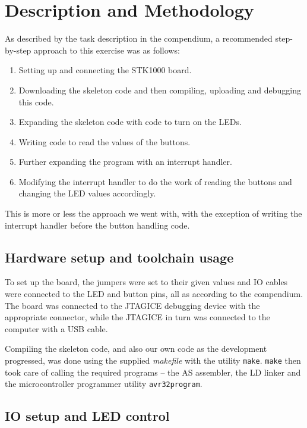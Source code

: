 \section{Description and Methodology}

As described by the task description in the compendium, a recommended
step-by-step approach to this exercise was as follows:

\begin{enumerate}
    \item Setting up and connecting the STK1000 board.
    \item Downloading the skeleton code and then compiling, uploading
    and debugging this code.
    \item Expanding the skeleton code with code to turn on the LEDs.
    \item Writing code to read the values of the buttons.
    \item Further expanding the program with an interrupt handler.
    \item Modifying the interrupt handler to do the work of reading the
    buttons and changing the LED values accordingly.
\end{enumerate}

This is more or less the approach we went with, with the exception of
writing the interrupt handler before the button handling code.

\subsection{Hardware setup and toolchain usage}

To set up the board, the jumpers were set to their given values and IO
cables were connected to the LED and button pins, all as according to
the compendium. The board was connected to the JTAGICE debugging device
with the appropriate connector, while the JTAGICE in turn was connected
to the computer with a USB cable.

Compiling the skeleton code, and also our own code as the development
progressed, was done using the supplied \emph{makefile} with the
utility \texttt{make}. \texttt{make} then took care of calling the
required programs -- the AS assembler, the LD linker and the
microcontroller programmer utility \texttt{avr32program}.

\subsection{IO setup and LED control}

